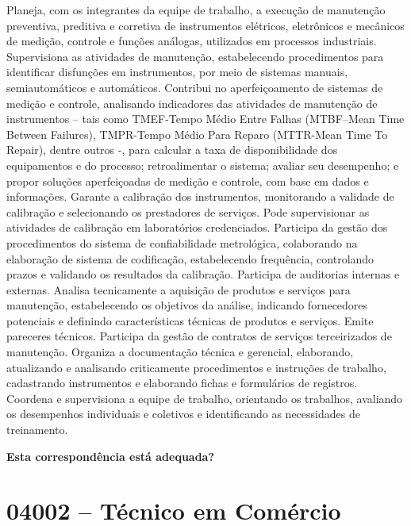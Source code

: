 \documentclass[
]{article}
\begin{document}
Planeja, com os integrantes da equipe de trabalho, a execução de
manutenção preventiva, preditiva e corretiva de instrumentos elétricos,
eletrônicos e mecânicos de medição, controle e funções análogas,
utilizados em processos industriais. Supervisiona as atividades de
manutenção, estabelecendo procedimentos para identificar disfunções em
instrumentos, por meio de sistemas manuais, semiautomáticos e
automáticos. Contribui no aperfeiçoamento de sistemas de medição e
controle, analisando indicadores das atividades de manutenção de
instrumentos -- tais como TMEF-Tempo Médio Entre Falhas (MTBF--Mean Time
Between Failures), TMPR-Tempo Médio Para Reparo (MTTR-Mean Time To
Repair), dentre outros -, para calcular a taxa de disponibilidade dos
equipamentos e do processo; retroalimentar o sistema; avaliar seu
desempenho; e propor soluções aperfeiçoadas de medição e controle, com
base em dados e informações. Garante a calibração dos instrumentos,
monitorando a validade de calibração e selecionando os prestadores de
serviços. Pode supervisionar as atividades de calibração em laboratórios
credenciados. Participa da gestão dos procedimentos do sistema de
confiabilidade metrológica, colaborando na elaboração de sistema de
codificação, estabelecendo frequência, controlando prazos e validando os
resultados da calibração. Participa de auditorias internas e externas.
Analisa tecnicamente a aquisição de produtos e serviços para manutenção,
estabelecendo os objetivos da análise, indicando fornecedores potenciais
e definindo características técnicas de produtos e serviços. Emite
pareceres técnicos. Participa da gestão de contratos de serviços
terceirizados de manutenção. Organiza a documentação técnica e
gerencial, elaborando, atualizando e analisando criticamente
procedimentos e instruções de trabalho, cadastrando instrumentos e
elaborando fichas e formulários de registros. Coordena e supervisiona a
equipe de trabalho, orientando os trabalhos, avaliando os desempenhos
individuais e coletivos e identificando as necessidades de treinamento.

\begin{Form}
\textbf{Esta correspondência está adequada?} \\ 
\end{Form}

\newpage
\section{ 04002 -- Técnico em Comércio }
\end{document}
